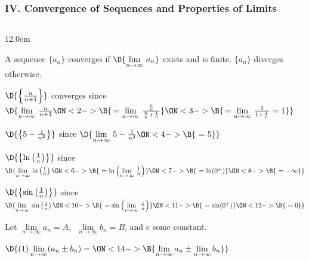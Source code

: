 \begin{frame}
\frametitle{IV. Convergence of Sequences and Properties of Limits}
\scriptsize
\begin{columns}
\begin{column}{12.0cm}

A sequence $\{a_n\}$ converges if $\D{\lim \limits_{n \to \infty}\, a_n}$ exists and is finite.  $\{a_n\}$ diverges otherwise.

\vspace{0.2cm}

\EX $\D{\left\{\frac{n}{n+1}\right\}}$ \quad converges \quad since \quad 
$\D{	\lim \limits_{n \to \infty}\, \frac{n}{n+1} 
\ON<2->{\B{\, = \lim \limits_{n \to \infty}\, \frac{\frac{n}{n}}{\frac{n}{n}+\frac{1}{n}}}} 
\ON<3->{\B{\, = \lim \limits_{n \to \infty}\, \frac{1}{1+\frac{1}{n}} = 1}}}$

\vspace{0.4cm}

\EX $\D{\left\{5 - \frac{1}{n^2}\right\}}$ \quad
{} \quad since \quad
$\D{
\lim \limits_{n \to \infty}\, 5 - \frac{1}{n^2}
\ON<4->{\B{\,\, = 5}}}$

\vspace{0.4cm}

\EX $\D{\left\{\ln\left(\frac{1}{n}\right)\right\}}$ \quad
{} \quad since \quad
$\D{
\lim \limits_{n \to \infty}\, \ln\left(\frac{1}{n}\right) 
\ON<6->{\B{\,\, = \ln\left( \lim \limits_{n \to \infty}\, \frac{1}{n}\right)}}
\ON<7->{\B{\,\,= \ln(0^+)}}
\ON<8->{\B{\,\,= -\infty}}}$

\vspace{0.4cm}

\EX $\D{\left\{\sin\left(\frac{1}{n}\right)\right\}}$ \quad
{} \quad since \quad
$\D{
\lim \limits_{n \to \infty}\, \sin\left(\frac{1}{n}\right) 
\ON<10->{\B{\,\, = \sin\left( \lim \limits_{n \to \infty}\, \frac{1}{n}\right)}}
\ON<11->{\B{\,\,= \sin(0^+)}}
\ON<12->{\B{\,\,= 0}}}$

\vspace{0.6cm}

Let $\lim \limits_{n \to \infty} a_n = A$, $\,\,\lim \limits_{n \to \infty} b_n = B$, and c some constant.

\vspace{0.2cm}

$\D{
(1) \lim \limits_{n \to \infty} (a_n \pm b_n) = 
\ON<14->{\B{\lim \limits_{n \to \infty} a_n \pm \lim \limits_{n \to \infty} b_n}}}$

\vspace{0.2cm}


\end{column}
\end{columns}
\end{frame}
